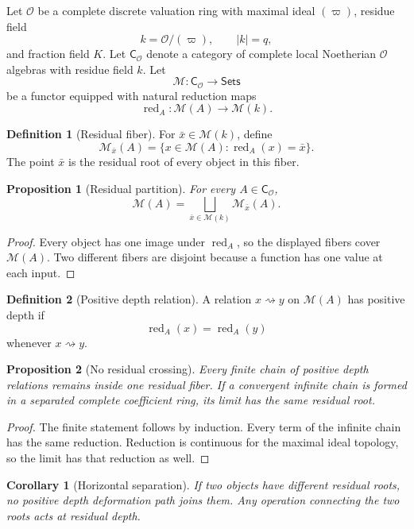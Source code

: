 \documentclass{aomart}
\newtheorem{proposition}[proposition]{Proposition}
\newtheorem{corollary}[corollary]{Corollary}
\theoremstyle{definition}
\newtheorem{definition}[definition]{Definition}
\theoremstyle{remark}
\newcommand{\OO}{\mathcal O}
\newcommand{\red}{\operatorname{red}}
\newcommand{\abs}[1]{\left\lvert#1\right\rvert}
\newcommand{\calM}{\mathcal M}
\begin{document}
Let \(\OO\) be a complete discrete valuation ring with maximal ideal \((\varpi)\), residue field
\[
k=\OO/(\varpi),
\qquad
\abs{k}=q,
\]
and fraction field \(K\). Let \(\mathsf C_{\OO}\) denote a category of complete local Noetherian \(\OO\) algebras with residue field \(k\). Let
\[
\calM:\mathsf C_{\OO}\longrightarrow\mathsf{Sets}
\]
be a functor equipped with natural reduction maps
\[
\red_A:\calM(A)\longrightarrow\calM(k).
\]

\begin{definition}[Residual fiber]\label{def:residual_fiber}
For \(\bar x\in\calM(k)\), define
\[
\calM_{\bar x}(A)
=
\{x\in\calM(A):\red_A(x)=\bar x\}.
\]
The point \(\bar x\) is the residual root of every object in this fiber.
\end{definition}

\begin{proposition}[Residual partition]\label{prop:residual_partition}
For every \(A\in\mathsf C_{\OO}\),
\[
\boxed{
\calM(A)
=
\bigsqcup_{\bar x\in\calM(k)}
\calM_{\bar x}(A).
}
\]
\end{proposition}

\begin{proof}
Every object has one image under \(\red_A\), so the displayed fibers cover \(\calM(A)\). Two different fibers are disjoint because a function has one value at each input.
\end{proof}

\begin{definition}[Positive depth relation]\label{def:positive_depth}
A relation \(x\rightsquigarrow y\) on \(\calM(A)\) has positive depth if
\[
\red_A(x)=\red_A(y)
\]
whenever \(x\rightsquigarrow y\).
\end{definition}

\begin{proposition}[No residual crossing]\label{prop:no_crossing}
Every finite chain of positive depth relations remains inside one residual fiber. If a convergent infinite chain is formed in a separated complete coefficient ring, its limit has the same residual root.
\end{proposition}

\begin{proof}
The finite statement follows by induction. Every term of the infinite chain has the same reduction. Reduction is continuous for the maximal ideal topology, so the limit has that reduction as well.
\end{proof}

\begin{corollary}[Horizontal separation]\label{cor:horizontal_separation}
If two objects have different residual roots, no positive depth deformation path joins them. Any operation connecting the two roots acts at residual depth.
\end{corollary}
\end{document}
